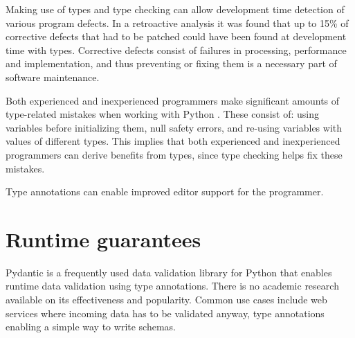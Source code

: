 Making use of types and type checking can allow development time detection of various program defects. In a retroactive analysis it was found that up to 15\% of corrective defects that had to be patched could have been found at development time with types\cite{khan_empirical_2022}. Corrective defects consist of failures in processing, performance and implementation, and thus preventing or fixing them is a necessary part of software maintenance.

Both experienced and inexperienced programmers make significant amounts of type-related mistakes when working with Python \cite{khan_empirical_2022}. These consist of: using variables before initializing them, null safety errors, and re-using variables with values of different types. This implies that both experienced and inexperienced programmers can derive benefits from types, since type checking helps fix these mistakes.


Type annotations can enable improved editor support for the programmer.

\section{Runtime guarantees}

Pydantic is a frequently used data validation library for Python that enables runtime data validation using type annotations\cite{pydanticdev_welcome_nodate}. There is no academic research available on its effectiveness and popularity. Common use cases include web services where incoming data has to be validated anyway, type annotations enabling a simple way to write schemas.

